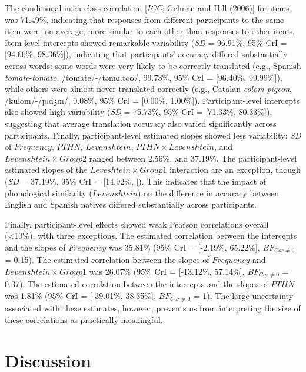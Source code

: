 \documentclass[
  english,
  man,floatsintext]{apa7}
\begin{document}
The conditional intra-class correlation {[}\emph{ICC}; Gelman and Hill (2006){]} for items was 71.49\%, indicating that responses from different participants to the same item were, on average, more similar to each other than responses to other items. Item-level intercepts showed remarkable variability (\emph{SD} = 96.91\%, 95\% CrI = {[}94.66\%, 98.36\%{]}), indicating that participants' accuracy differed substantially across words: some words were very likely to be correctly translated (e.g., Spanish \emph{tomate}-\emph{tomato}, /tomate/-/təmɑːtoʊ/, 99.73\%, 95\% CrI = {[}96.40\%, 99.99\%{]}), while others were almost never translated correctly (e.g., Catalan \emph{colom}-\emph{pigeon}, /kulom/-/pɪdʒɪn/, 0.08\%, 95\% CrI = {[}0.00\%, 1.00\%{]}). Participant-level intercepts also showed high variability (\emph{SD} = 75.73\%, 95\% CrI = {[}71.33\%, 80.33\%{]}), suggesting that average translation accuracy also varied significantly across participants. Finally, participant-level estimated slopes showed less variability: \emph{SD} of \(Frequency\), \(PTHN\), \(Levenshtein\), \(PTHN \times Levenshtein\), and \(Levenshtein \times Group 2\) ranged between 2.56\%, and 37.19\%. The participant-level estimated slopes of the \(Leveshtein \times Group 1\) interaction are an exception, though (\emph{SD} = 37.19\%, 95\% CrI = {[}14.92\%, {]}). This indicates that the impact of phonological similarity (\(Levenshtein\)) on the difference in accuracy between English and Spanish natives differed substantially across participants.

Finally, participant-level effects showed weak Pearson correlations overall (\textless10\%), with three exceptions. The estimated correlation between the intercepts and the slopes of \(Frequency\) was 35.81\% (95\% CrI = {[}-2.19\%, 65.22\%{]}, \(BF_{Cor \neq 0}\) = 0.15). The estimated correlation between the slopes of \(Frequency\) and \(Levenshtein \times Group 1\) was 26.07\% (95\% CrI = {[}-13.12\%, 57.14\%{]}, \(BF_{Cor \neq 0}\) = 0.37). The estimated correlation between the intercepts and the slopes of \(PTHN\) was 1.81\% (95\% CrI = {[}-39.01\%, 38.35\%{]}, \(BF_{Cor \neq 0}\) = 1). The large uncertainty associated with these estimates, however, prevents us from interpreting the size of these correlations as practically meaningful.

\hypertarget{discussion}{%
\section{Discussion}\label{discussion}}
\end{document}
